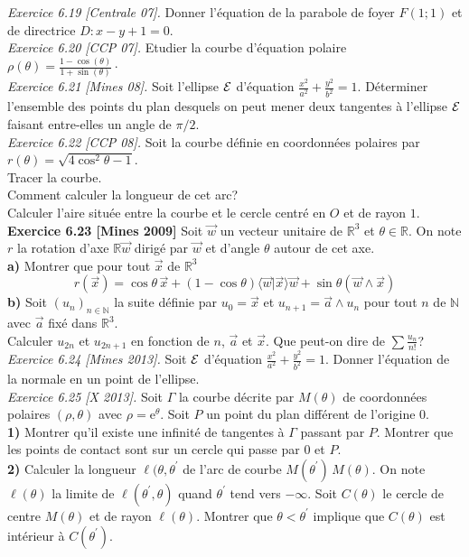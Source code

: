 \documentclass[a4paper,12pt,francais]{article}
\newcommand{\field}[1]{\mathbb{#1}}
\newcommand{\N}{\field{N}}
\newcommand{\R}{\field{R}}
\newcommand{\e}{\mbox{e}}
\begin{document}
\noindent
{\it Exercice 6.19 [Centrale 07].} Donner l'équation de la parabole de foyer $F(1;1)$ et de directrice $D:x-y+1=0$.\\

\noindent
{\it Exercice 6.20 [CCP 07].} Etudier la courbe d'équation polaire $\displaystyle \rho(\theta)=\frac{1-\cos(\theta)}{1+\sin(\theta)} \cdot$\\

\noindent
{\it Exercice 6.21 [Mines 08].} Soit l'ellipse $\cal{E}$ d'équation $\frac{x^2}{a^2}+\frac{y^2}{b^2}=1$. Déterminer l'ensemble des points du plan desquels on peut mener deux tangentes à l'ellipse $\cal{E}$ faisant entre-elles un angle de $\pi/2$.\\ 

\noindent
{\it Exercice 6.22 [CCP 08].} Soit la courbe définie en coordonnées polaires par $r(\theta)=\sqrt{4\cos^2 \theta -1}$.\\
 Tracer la courbe.\\
 Comment calculer la longueur de cet arc?\\
 Calculer l'aire située entre la courbe et le cercle centré en $O$ et de rayon $1$.\\


\noindent
{\bf Exercice 6.23 [Mines 2009]} Soit $\vec{w}$ un vecteur unitaire de $\R^3$ et $\theta\in \R$. On note $r$ la rotation d'axe $\R \vec{w}$ dirigé par $\vec{w}$ et d'angle $\theta$ autour de cet axe.\\
{\bf a)} Montrer que pour tout $\vec{x}$ de $\R^3$
$$r(\vec{x})=\cos \theta \, \vec{x} +(1-\cos \theta) \langle \vec{w}|\vec{x}\rangle \vec{w}+\sin \theta (\vec{w} \wedge \vec{x} )$$
{\bf b)} Soit $(u_n)_{n \in \N}$ la suite définie par $u_0=\vec{x}$ et $u_{n+1}=\vec{a}\wedge u_n$ pour tout $n$ de $\N$ avec $\vec{a}$ fixé dans $\R^3$.\\
Calculer $u_{2n}$ et $u_{2n+1}$ en fonction de $n$, $\vec{a}$ et $\vec{x}$. Que peut-on dire de $\sum \frac{u_n}{n!}$?\\

\noindent
{\it Exercice 6.24 [Mines 2013].} Soit $\cal{E}$ d'équation $\displaystyle \frac{x^2}{a^2}+\frac{y^2}{b^2}=1$. Donner l'équation de la normale en un point de l'ellipse.\\

\noindent
{\it Exercice 6.25 [X 2013].} Soit $\Gamma$ la courbe décrite par $M(\theta)$ de coordonnées polaires $(\rho, \theta)$ avec $\rho=\e^\theta$. Soit $P$ un point du plan différent de l'origine $0$.\\
{\bf 1)} Montrer qu'il existe une infinité de tangentes à $\Gamma$ passant par $P$. Montrer que les points
de contact sont sur un cercle qui passe par $0$ et $P$.\\
{\bf 2)} Calculer la longueur $\ell(\theta,\theta^\prime$ de l’arc de courbe $M(\theta^\prime)\, M(\theta)$. On note $\ell(\theta)$ la limite de $\ell(\theta^\prime,\theta)$ quand $\theta^\prime$ tend vers $-\infty$. Soit $C(\theta)$ le cercle de centre $M(\theta)$ et de rayon $\ell(\theta)$. Montrer
que $\theta < \theta^\prime$ implique que $C(\theta)$ est intérieur à $C(\theta^\prime)$.\\
\end{document}
